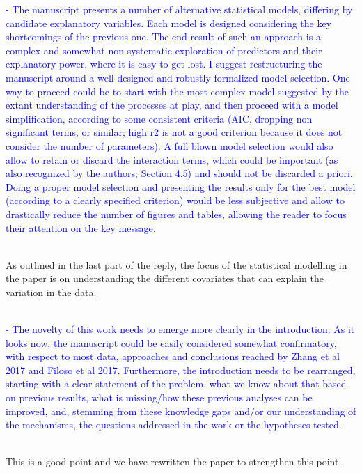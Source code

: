 \documentclass[]{elsarticle} %
\begin{document}
\textcolor{blue}{- The manuscript presents a number of alternative statistical models, differing by candidate explanatory variables. Each model is designed considering the key shortcomings of the previous one. The end result of such an approach is a complex and somewhat non systematic exploration of predictors and their explanatory power, where it is easy to get lost. I suggest restructuring the manuscript around a well-designed and robustly formalized model selection. One way to proceed could be to start with the most complex model suggested by the extant understanding of the processes at play, and then proceed with a model simplification, according to some consistent criteria (AIC, dropping non significant terms, or similar; high r2 is not a good criterion because it does not consider the number of parameters). A full blown model selection would also allow to retain or discard the interaction terms, which could be important (as also recognized by the authors; Section 4.5) and should not be discarded a priori. Doing a proper model selection and presenting the results only for the best model (according to a clearly specified criterion) would be less subjective and allow to drastically reduce the number of figures and tables, allowing the reader to focus their attention on the key message.}\\
\strut \\
As outlined in the last part of the reply, the focus of the statistical modelling in the paper is on understanding the different covariates that can explain the variation in the data.\\
\strut \\

\textcolor{blue}{- The novelty of this work needs to emerge more clearly in the introduction. As it looks now, the manuscript could be easily considered somewhat confirmatory, with respect to most data, approaches and conclusions reached by Zhang et al 2017 and Filoso et al 2017. Furthermore, the introduction needs to be rearranged, starting with a clear statement of the problem, what we know about that based on previous results, what is missing/how these previous analyses can be improved, and, stemming from these knowledge gaps and/or our understanding of the mechanisms, the questions addressed in the work or the hypotheses tested.}\\
\strut \\
This is a good point and we have rewritten the paper to strengthen this point.\\
\strut \\
\end{document}
